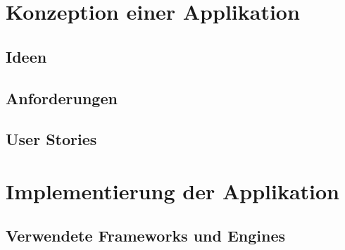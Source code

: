 
\chapter{Konzeption einer Applikation}
\section{Ideen}
\section{Anforderungen}
\section{User Stories}

\chapter{Implementierung der Applikation}
\section{Verwendete Frameworks und Engines}
